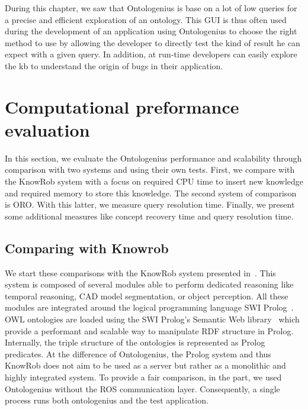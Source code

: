 During this chapter, we saw that Ontologenius is base on a lot of low queries for a precise and efficient exploration of an ontology. This GUI is thus often used during the development of an application using Ontologenius to choose the right method to use by allowing the developer to directly test the kind of result he can expect with a given query. In addition, at run-time developers can easily explore the \acrshort{kb} to understand the origin of bugs in their application.

\section{Computational preformance evaluation}

In this section, we evaluate the Ontologenius performance and scalability through comparison with two systems and using their own tests. First, we compare with the KnowRob system with a focus on required CPU time to insert new knowledge and required memory to store this knowledge. The second system of comparison is ORO. With this latter, we measure query resolution time. Finally, we present some additional measures like concept recovery time and \sparql{} query resolution time.

\subsection{Comparing with Knowrob}

We start these comparisons with the KnowRob system presented in~\cite{tenorth_2013_knowrob}. This system is composed of several modules able to perform dedicated reasoning like temporal reasoning, CAD model segmentation, or object perception. All these modules are integrated around the logical programming language SWI Prolog~\cite{wielemaker_2012_swi}. OWL ontologies are loaded using the SWI Prolog’s Semantic Web library~\cite{wielemaker_2003_prolog} which provide a performant and scalable way to manipulate RDF structure in Prolog. Internally, the triple structure of the ontologies is represented as Prolog predicates. At the difference of Ontologenius, the Prolog system and thus KnowRob does not aim to be used as a server but rather as a monolithic and highly integrated system. To provide a fair comparison, in the part, we used Ontologenius without the ROS communication layer. Consequently, a single process runs both ontologenius and the test application.

